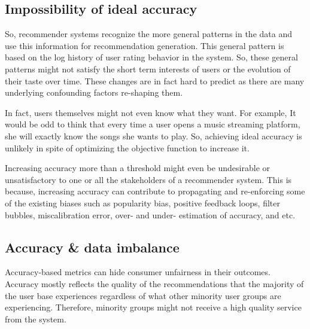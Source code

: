 \subsection{Impossibility of ideal accuracy}
So, recommender systems recognize the more general patterns in the data and use this information for recommendation generation. This general pattern is based on the log history of user rating behavior in the system. So, these general patterns might not satisfy the short term interests of users or the evolution of their taste over time. These changes are in fact hard to predict as there are many underlying confounding factors re-shaping them.

In fact, users themselves might not even know what they want. For example, It would be odd to think that every time a user opens a music streaming platform, she will exactly know the songs she wants to play. So, achieving ideal accuracy is unlikely in spite of optimizing the objective function to increase it.


Increasing accuracy more than a threshold might even be undesirable or unsatisfactory to one or all the stakeholders of a recommender system. This is because, increasing accuracy can contribute to propagating and re-enforcing some of the existing biases such as popularity bias, positive feedback loops, filter bubbles, miscalibration error, over- and under- estimation of accuracy, and etc. 


\subsection{Accuracy \& data imbalance}
Accuracy-based metrics can hide consumer unfairness in their outcomes. Accuracy mostly reflects the quality of the recommendations that the majority of the user base experiences regardless of what other minority user groups are experiencing. Therefore, minority groups might not receive a high quality service from the system. 

